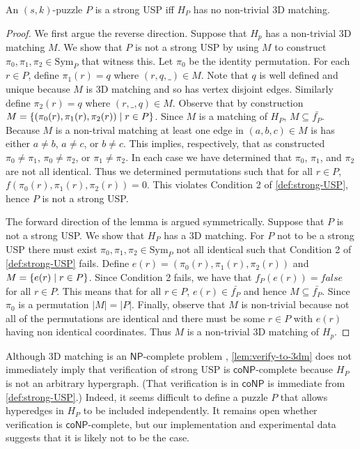 \documentclass[11pt]{article}
\newcommand\sse{\subseteq}
\newcommand\Sym[1]{\ensuremath{\mathrm{Sym}_{#1}}}
\newcommand\condset[2]{\set{#1 \;|\; #2}}
\renewcommand\NP{\ensuremath{\mathsf{NP}}}
\newcommand\coNP{\ensuremath{\mathsf{coNP}}}
\begin{document}
\begin{lemma}
  \label{lem:verify-to-3dm}
  An $(s,k)$-puzzle $P$ is a strong USP iff $H_P$ has no non-trivial 3D
  matching.
\end{lemma}

\begin{proof}
  We first argue the reverse direction.  Suppose that $H_p$ has a
  non-trivial 3D matching $M$.  We show that $P$ is not a strong USP by
  using $M$ to construct $\pi_0, \pi_1, \pi_2 \in \Sym{P}$ that
  witness this.  Let $\pi_0$ be the identity permutation.  For each $r
  \in P$, define $\pi_1(r) = q$ where $(r,q,\_) \in M$.  Note that $q$
  is well defined and unique because $M$ is 3D matching and so has
  vertex disjoint edges.  Similarly define $\pi_2(r) = q$ where
  $(r,\_,q) \in M$.  Observe that by construction $M =
  \condset{(\pi_0(r),\pi_1(r),\pi_2(r))}{r \in P}$.  Since $M$ is a
  matching of $H_P$, $M \sse \bar{f_P}$.  Because $M$ is a non-trival
  matching at least one edge in $(a,b,c) \in M$ is has either $a \neq
  b$, $a \neq c$, or $b \neq c$.  This implies, respectively, that as
  constructed $\pi_0 \neq \pi_1$, $\pi_0 \neq \pi_2$, or $\pi_1 \neq
  \pi_2$.  In each case we have determined that $\pi_0$, $\pi_1$, and
  $\pi_2$ are not all identical.  Thus we determined permutations such
  that for all $r \in P$, $f(\pi_0(r), \pi_1(r), \pi_2(r)) = 0$.  This
  violates Condition 2 of \autoref{def:strong-USP}, hence $P$ is not a
  strong USP.

  The forward direction of the lemma is argued symmetrically.  Suppose
  that $P$ is not a strong USP. We show that $H_P$ has a 3D matching.
  For $P$ not to be a strong USP there must exist $\pi_0, \pi_1, \pi_2
  \in \Sym{P}$ not all identical such that Condition 2 of
  \autoref{def:strong-USP} fails.  Define $e(r) =
  (\pi_0(r),\pi_1(r),\pi_2(r))$ and $M = \condset{e(r)}{r \in P}$.
  Since Condition 2 fails, we have that $f_P(e(r)) = false$ for all $r
  \in P$.  This means that for all $r \in P$, $e(r) \in \bar{f_P}$ and
  hence $M \sse \bar{f_P}$.  Since $\pi_0$ is a permutation $|M| =
  |P|$.  Finally, observe that $M$ is non-trivial because not all of
  the permutations are identical and there must be some $r \in P$ with
  $e(r)$ having non identical coordinates.  Thus $M$ is a non-trivial
  3D matching of $H_p$.
\end{proof}

Although 3D matching is an \NP-complete problem \cite{gj79},
\autoref{lem:verify-to-3dm} does not immediately imply that
verification of strong USP is \coNP-complete because $H_P$ is not an
arbitrary hypergraph.  (That verification is in \coNP{} is immediate
from \autoref{def:strong-USP}.)  Indeed, it seems difficult to define
a puzzle $P$ that allows hyperedges in $H_P$ to be included
independently.  It remains open whether verification is
\coNP-complete, but our implementation and experimental data suggests
that it is likely not to be the case.
\end{document}
